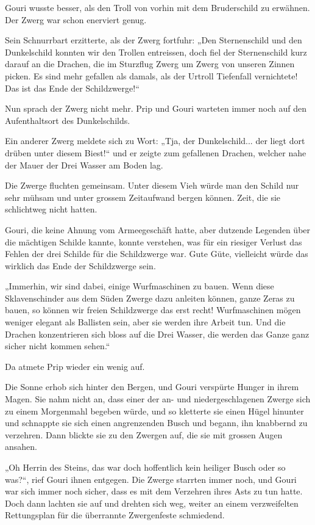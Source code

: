 \documentclass[10pt, a4paper, oneside]{book}
\begin{document}
Gouri wusste besser, als den Troll von vorhin mit dem Bruderschild zu erwähnen. Der Zwerg war schon enerviert genug.

Sein Schnurrbart erzitterte, als der Zwerg fortfuhr: „Den Sternenschild und den Dunkelschild konnten wir den Trollen entreissen, doch fiel der Sternenschild kurz darauf an die Drachen, die im Sturzflug Zwerg um Zwerg von unseren Zinnen picken. Es sind mehr gefallen als damals, als der Urtroll Tiefenfall vernichtete! Das ist das Ende der Schildzwerge!“

Nun sprach der Zwerg nicht mehr. Prip und Gouri warteten immer noch auf den Aufenthaltsort des Dunkelschilds.

Ein anderer Zwerg meldete sich zu Wort: „Tja, der Dunkelschild... der liegt dort drüben unter diesem Biest!“ und er zeigte zum gefallenen Drachen, welcher nahe der Mauer der Drei Wasser am Boden lag.

Die Zwerge fluchten gemeinsam. Unter diesem Vieh würde man den Schild nur sehr mühsam und unter grossem Zeitaufwand bergen können. Zeit, die sie schlichtweg nicht hatten.

Gouri, die keine Ahnung vom Armeegeschäft hatte, aber dutzende Legenden über die mächtigen Schilde kannte, konnte verstehen, was für ein riesiger Verlust das Fehlen der drei Schilde für die Schildzwerge war. Gute Güte, vielleicht würde das wirklich das Ende der Schildzwerge sein.

„Immerhin, wir sind dabei, einige Wurfmaschinen zu bauen. Wenn diese Sklavenschinder aus dem Süden Zwerge dazu anleiten können, ganze Zeras zu bauen, so können wir freien Schildzwerge das erst recht! Wurfmaschinen mögen weniger elegant als Ballisten sein, aber sie werden ihre Arbeit tun. Und die Drachen konzentrieren sich bloss auf die Drei Wasser, die werden das Ganze ganz sicher nicht kommen sehen.“

Da atmete Prip wieder ein wenig auf.\bigskip



Die Sonne erhob sich hinter den Bergen, und Gouri verspürte Hunger in ihrem Magen. Sie nahm nicht an, dass einer der an- und niedergeschlagenen Zwerge sich zu einem Morgenmahl begeben würde, und so kletterte sie einen Hügel hinunter und schnappte sie sich einen angrenzenden Busch und begann, ihn knabbernd zu verzehren. Dann blickte sie zu den Zwergen auf, die sie mit grossen Augen ansahen.

„Oh Herrin des Steins, das war doch hoffentlich kein heiliger Busch oder so was?“, rief Gouri ihnen entgegen. Die Zwerge starrten immer noch, und Gouri war sich immer noch sicher, dass es mit dem Verzehren ihres Asts zu tun hatte. Doch dann lachten sie auf und drehten sich weg, weiter an einem verzweifelten Rettungsplan für die überrannte Zwergenfeste schmiedend.
\end{document}
